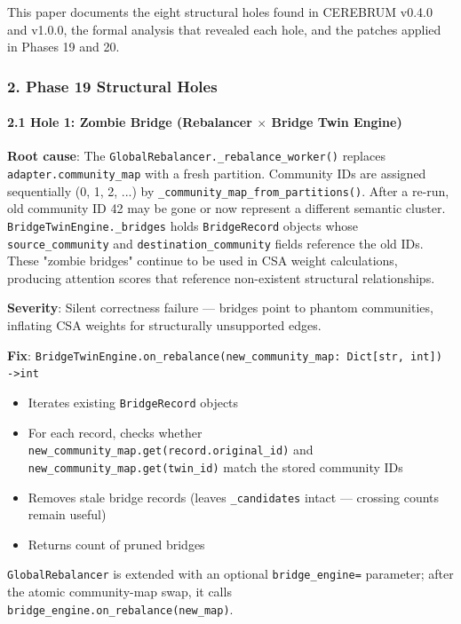 This paper documents the eight structural holes found in CEREBRUM v0.4.0 and v1.0.0, the formal analysis that revealed each hole, and the patches applied in Phases 19 and 20.

\subsubsection{2. Phase 19 Structural Holes}

\paragraph{2.1 Hole 1: Zombie Bridge (Rebalancer $\times$ Bridge Twin Engine)}

\textbf{Root cause}: The \texttt{GlobalRebalancer.\_rebalance\_worker()} replaces \texttt{adapter.community\_map} with a fresh partition. Community IDs are assigned seque\-ntially (0, 1, 2, ...) by \texttt{\_community\_map\_from\_partitions()}. After a re-run, old community ID 42 may be gone or now represent a different semantic cluster. \texttt{BridgeTwinEngine.\_bridges} holds \texttt{BridgeRecord} objects whose \texttt{source\_community} and \texttt{destination\_community} fields reference the old IDs. These "zombie bridges" continue to be used in CSA weight calcu\-lations, producing attention scores that reference non-existent structural relat\-ionships.

\textbf{Severity}: Silent correctness failure — bridges point to phantom communities, inflating CSA weights for struc\-turally unsupported edges.

\textbf{Fix}: \texttt{BridgeTwinEngine.on\_rebalance(new\_community\_map: Dict[str, int]) -\textgreater  int}
\begin{itemize}
\item Iterates existing \texttt{BridgeRecord} objects
\item For each record, checks whether \texttt{new\_community\_map.get(record.original\_id)} and \texttt{new\_community\_map.get(twin\_id)} match the stored community IDs
\item Removes stale bridge records (leaves \texttt{\_candidates} intact — crossing counts remain useful)
\item Returns count of pruned bridges

\end{itemize}
\texttt{GlobalRebalancer} is extended with an optional \texttt{bridge\_engine=} parameter; after the atomic community-map swap, it calls \texttt{bridge\_engine.on\_rebalance(new\_map)}.

